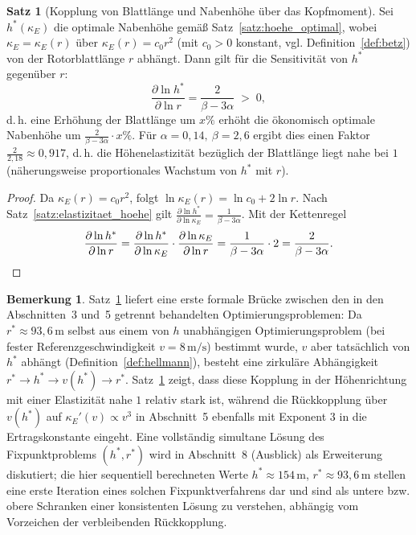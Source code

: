 ﻿\documentclass[a4paper,12pt]{article}
\theoremstyle{definition}
\newtheorem{satz}{Satz}
\newtheorem{bemerkung}{Bemerkung}
\begin{document}
\begin{satz}[Kopplung von Blattlänge und Nabenhöhe über das Kopfmoment]
\label{satz:kopplung_rh}
Sei $h^*(\kappa_E)$ die optimale Nabenhöhe gemäß Satz~\ref{satz:hoehe_optimal}, wobei $\kappa_E = \kappa_E(r)$ über $\kappa_E(r) = c_0 r^2$ (mit $c_0>0$ konstant, vgl. Definition~\ref{def:betz}) von der Rotorblattlänge $r$ abhängt. Dann gilt für die Sensitivität von $h^*$ gegenüber $r$:
\[
\frac{\partial \ln h^*}{\partial \ln r} = \frac{2}{\beta-3\alpha} \;>\; 0,
\]
d.\,h. eine Erhöhung der Blattlänge um $x\%$ erhöht die ökonomisch optimale Nabenhöhe um $\frac{2}{\beta-3\alpha}\cdot x\%$. Für $\alpha=0{,}14,\ \beta=2{,}6$ ergibt dies einen Faktor $\frac{2}{2{,}18}\approx0{,}917$, d.\,h. die Höhenelastizität bezüglich der Blattlänge liegt nahe bei $1$ (näherungsweise proportionales Wachstum von $h^*$ mit $r$).
\end{satz}

\begin{proof}
Da $\kappa_E(r)=c_0 r^2$, folgt $\ln\kappa_E(r) = \ln c_0 + 2\ln r$. Nach Satz~\ref{satz:elastizitaet_hoehe} gilt $\frac{\partial\ln h^*}{\partial\ln\kappa_E}=\frac{1}{\beta-3\alpha}$. Mit der Kettenregel
\[
\frac{\partial\ln h^*}{\partial \ln r} = \frac{\partial\ln h^*}{\partial\ln\kappa_E}\cdot\frac{\partial\ln\kappa_E}{\partial\ln r} = \frac{1}{\beta-3\alpha}\cdot 2 = \frac{2}{\beta-3\alpha}. \qedhere
\]
\end{proof}

\begin{bemerkung}
Satz~\ref{satz:kopplung_rh} liefert eine erste formale Brücke zwischen den in den Abschnitten~3 und~5 getrennt behandelten Optimierungsproblemen: Da $r^*\approx93{,}6\,\mathrm{m}$ selbst aus einem von $h$ unabhängigen Optimierungsproblem (bei fester Referenzgeschwindigkeit $v=8\,\mathrm{m/s}$) bestimmt wurde, $v$ aber tatsächlich von $h^*$ abhängt (Definition~\ref{def:hellmann}), besteht eine zirkuläre Abhängigkeit $r^*\to h^*\to v(h^*)\to r^*$. Satz~\ref{satz:kopplung_rh} zeigt, dass diese Kopplung in der Höhenrichtung mit einer Elastizität nahe $1$ relativ stark ist, während die Rückkopplung über $v(h^*)$ auf $\kappa_E'(v)\propto v^3$ in Abschnitt~5 ebenfalls mit Exponent $3$ in die Ertragskonstante eingeht. Eine vollständig simultane Lösung des Fixpunktproblems $(h^*,r^*)$ wird in Abschnitt~8 (Ausblick) als Erweiterung diskutiert; die hier sequentiell berechneten Werte $h^*\approx154\,\mathrm{m}$, $r^*\approx93{,}6\,\mathrm{m}$ stellen eine erste Iteration eines solchen Fixpunktverfahrens dar und sind als untere bzw. obere Schranken einer konsistenten Lösung zu verstehen, abhängig vom Vorzeichen der verbleibenden Rückkopplung.
\end{bemerkung}
\end{document}
